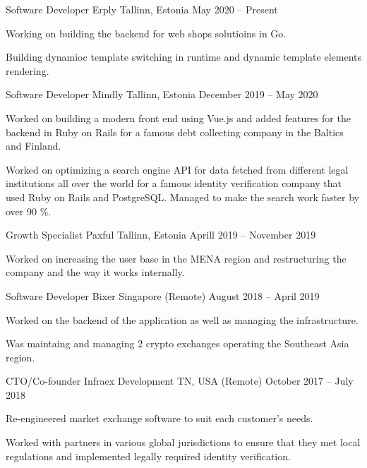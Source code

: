 \documentclass[]{awesome-cv}
\begin{document}
\vspace{-8mm}
\begin{cventries}
	\cventry
	{Software Developer}
	{Erply}
	{Tallinn, Estonia}
	{May 2020 – Present}
	{\begin{cvitems}
		\item {Working on building the backend for web shops solutioins in Go.}
		\item {Building dynamioc template switching in runtime and dynamic template elements rendering.}
		\end{cvitems}}
	\cventry
	{Software Developer}
	{Mindly}
	{Tallinn, Estonia}
	{December 2019 – May 2020}
	{\begin{cvitems}
		\item {Worked on building a modern front end using Vue.js and added features for the backend in Ruby on Rails for a famous debt collecting company in the Baltics and Finland.}
		\item {Worked on optimizing a search engine API for data fetched from different legal institutions all over the world for a famous identity verification company that used Ruby on Rails and PostgreSQL. Managed to make the search work faster by over 90 \%.}
		\end{cvitems}}
	\cventry
	{Growth Specialist}
	{Paxful}
	{Tallinn, Estonia}
	{Aprill 2019 – November 2019}
	{\begin{cvitems}
		\item {Worked on increasing the user base in the MENA region and restructuring the company and the way it works internally.}
		\end{cvitems}}
	\cventry
	{Software Developer}
	{Bixer}
	{Singapore (Remote)}
	{August 2018 – April 2019}
	{\begin{cvitems}
		\item {Worked on the backend of the application as well as managing the infrastructure.}
		\item {Was maintaing and managing 2 crypto exchanges operating the Southeast Asia region.}
		\end{cvitems}}
	\cventry
	{CTO/Co-founder}
	{Infraex Development}
	{TN, USA (Remote)}
	{October 2017 – July 2018}
	{\begin{cvitems}
		\item {Re-engineered market exchange software to suit each customer’s needs.}
		\item {Worked with partners in various global jurisdictions to ensure that they met local regulations and implemented legally required identity verification.}

\end{cvitems}}
\end{cventries}
\end{document}
